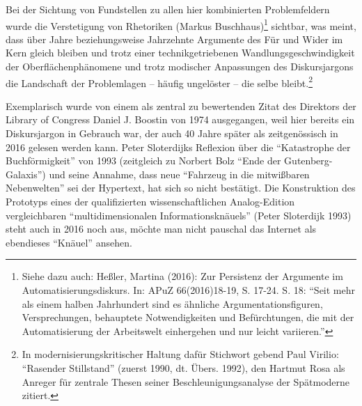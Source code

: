 \documentclass[a4paper,
fontsize=11pt,
oneside,
numbers=noperiodatend,
parskip=half-,
bibliography=totoc,
final
]{scrartcl}
\begin{document}
Bei der Sichtung von Fundstellen zu allen hier kombinierten
Problemfeldern wurde die Verstetigung von Rhetoriken (Markus
Buschhaus)\footnote{Siehe dazu auch: Heßler, Martina (2016): Zur
  Persistenz der Argumente im Automatisierungsdiskurs. In: APuZ
  66(2016)18-19, S. 17-24. S. 18: \enquote{Seit mehr als einem halben
  Jahrhundert sind es ähnliche Argumentationsfiguren, Versprechungen,
  behauptete Notwendigkeiten und Befürchtungen, die mit der
  Automatisierung der Arbeitswelt einhergehen und nur leicht variieren.}}
sichtbar, was meint, dass über Jahre beziehungsweise Jahrzehnte
Argumente des Für und Wider im Kern gleich bleiben und trotz einer
technikgetriebenen Wandlungsgeschwindigkeit der Oberflächenphänomene und
trotz modischer Anpassungen des Diskursjargons die Landschaft der
Problemlagen -- häufig ungelöster -- die selbe bleibt.\footnote{In
  modernisierungskritischer Haltung dafür Stichwort gebend Paul Virilio:
  \enquote{Rasender Stillstand} (zuerst 1990, dt. Übers. 1992), den
  Hartmut Rosa als Anreger für zentrale Thesen seiner
  Beschleunigungsanalyse der Spätmoderne zitiert.}

Exemplarisch wurde von einem als zentral zu bewertenden Zitat des
Direktors der Library of Congress Daniel J. Boostin von 1974
ausgegangen, weil hier bereits ein Diskursjargon in Gebrauch war, der
auch 40 Jahre später als zeitgenössisch in 2016 gelesen werden kann.
Peter Sloterdijks Reflexion über die \enquote{Katastrophe der
Buchförmigkeit} von 1993 (zeitgleich zu Norbert Bolz \enquote{Ende der
Gutenberg-Galaxis}) und seine Annahme, dass neue \enquote{Fahrzeug in
die mitwißbaren Nebenwelten} sei der Hypertext, hat sich so nicht
bestätigt. Die Konstruktion des Prototyps eines der qualifizierten
wissenschaftlichen Analog-Edition vergleichbaren
\enquote{multidimensionalen Informationsknäuels} (Peter Sloterdijk 1993)
steht auch in 2016 noch aus, möchte man nicht pauschal das Internet als
ebendieses \enquote{Knäuel} ansehen.
\end{document}
